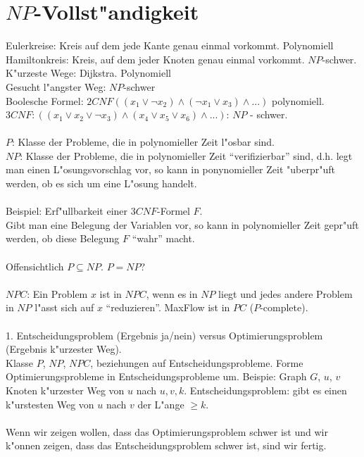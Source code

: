 \section{$NP$-Vollst"andigkeit}
Eulerkreise: Kreis auf dem jede Kante genau einmal vorkommt. Polynomiell\\
Hamiltonkreis: Kreis, auf dem jeder Knoten genau einmal vorkommt. $NP$-schwer.\\
K"urzeste Wege: Dijkstra. Polynomiell\\
Gesucht l"angster Weg: $NP$-schwer\\
Boolesche Formel: $2 CNF ((x_1 \vee \neg x_2) \wedge (\neg x_1 \vee x_3) \wedge ...)$ polynomiell.\\
$3 CNF: ((x_1 \vee x_2 \vee \neg x_3) \wedge (x_4 \vee x_5 \vee x_6) \wedge ...)$: $NP$ - schwer.\\\\
$P$: Klasse der Probleme, die in polynomieller Zeit l"osbar sind.\\
$NP$: Klasse der Probleme, die in polynomieller Zeit "`verifizierbar"' sind, d.h. legt man einen L"osungsvorschlag vor, so kann in ponynomieller Zeit "uberpr"uft werden, ob es sich um eine L"osung handelt.\\\\
Beispiel: Erf"ullbarkeit einer $3 CNF$-Formel $F$.\\
Gibt man eine Belegung der Variablen vor, so kann in polynomieller Zeit gepr"uft werden, ob diese Belegung $F$ "`wahr"' macht.\\\\
Offensichtlich $P \subseteq NP$. $P = NP$?\\\\
$NPC$: Ein Problem $x$ ist in $NPC$, wenn es in $NP$ liegt und jedes andere Problem in $NP$ l"asst sich auf $x$ "`reduzieren"'. MaxFlow ist in $PC$ ($P$-complete).\\\\
1. Entscheidungsproblem (Ergebnis ja/nein) versus Optimierungsproblem (Ergebnis k"urzester Weg).\\
Klasse $P$, $NP$, $NPC$, beziehungen auf Entscheidungsprobleme. Forme Optimierungsprobleme in Entscheidungsprobleme um. Beispie: Graph $G$, $u$, $v$ Knoten k"urzester Weg von $u$ nach $u, v, k$. Entscheidungsproblem: gibt es einen k"urstesten Weg von $u$ nach $v$ der L"ange $\geq k$.\\\\
Wenn wir zeigen wollen, dass das Optimierungsproblem schwer ist und wir k"onnen zeigen, dass das Entscheidungsproblem schwer ist, sind wir fertig.\\\\
